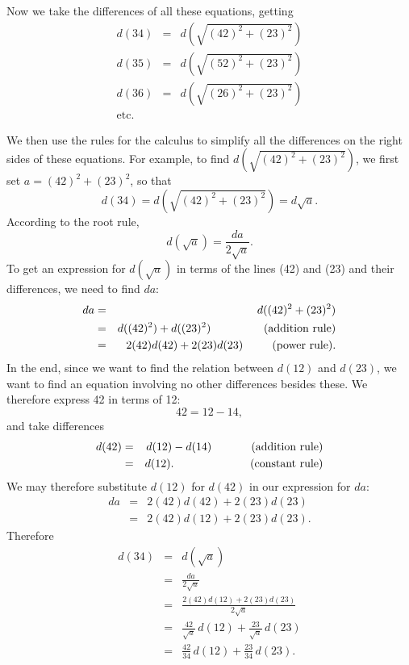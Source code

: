 \documentclass[polutonikogreek,english,twoside,openright]{article}
\newlength{\oldjot}
\begin{document}
Now we take the differences of all these equations, getting
\setlength{\jot}{1ex}
\begin{eqnarray*}
d(34) & = &d(\sqrt{(42)^2 + (23)^2})\\
d(35) & = &d( \sqrt{(52)^2 + (23)^2})\\
d(36) & = & d(\sqrt{(26)^2 + (23)^2})\\
\mbox{etc.} & & 
\end{eqnarray*}
\setlength{\jot}{\oldjot}

We then use the rules for the calculus to simplify all the differences
on the right sides of these equations.  For example, to find
$d(\sqrt{(42)^2 + (23)^2})$, we first set $a = (42)^2 + (23)^2$, so
that
$$d(34) = d(\sqrt{(42)^2 + (23)^2}) = d\sqrt{a}.$$
According to the root rule,
$$d(\sqrt{a}) = \frac{da}{2\sqrt{a}}.$$
To get an expression for $d(\sqrt{a})$ in terms of the lines (42) and
(23) and their differences, we need to find $da$:
\setlength{\jot}{1.5ex}
\begin{eqnarray*}
da & = & d((42)^2 + (23)^2) \\
& = & d((42)^2) + d((23)^2) \mbox{\hspace{10.9ex}(addition rule)}\\
& = & 2(42)d(42) + 2(23)d(23) \mbox{\hspace{6ex}(power rule).}
\end{eqnarray*}
\setlength{\jot}{\oldjot}
In the end, since we want to find the relation between $d(12)$ and
$d(23)$, we want to find an equation involving no other differences
besides these.  We therefore express 42 in terms of 12:
$$42 = 12 - 14,$$
and take differences
\begin{eqnarray*}
d(42) & = & d(12) -d(14) \mbox{\hspace{7.4ex} (addition rule)}\\
 & = & d(12). \mbox{\hspace{15ex} (constant rule)}
 \end{eqnarray*}
We may therefore substitute $d(12)$ for $d(42)$ in our expression for $da$:
\setlength{\jot}{1ex}
\begin{eqnarray*}
da & = & 2(42)d(42) + 2(23)d(23)\\
& = & 2(42)d(12) + 2(23)d(23).
\end{eqnarray*}
\setlength{\jot}{\oldjot}
Therefore
\setlength{\jot}{1.5ex}
\begin{eqnarray*}
d(34) & = & d(\sqrt{a})\\
 & = & \frac{da}{2\sqrt{a}}\\
 & = & \frac{2(42)d(12) + 2(23)d(23)}{2\sqrt{a}}\\
 & = & \frac{42}{\sqrt{a}}\,d(12) + \frac{23}{\sqrt{a}}\,d(23)\\
 & = & \frac{42}{34}\,d(12) + \frac{23}{34}\,d(23).
 \end{eqnarray*}
\end{document}
